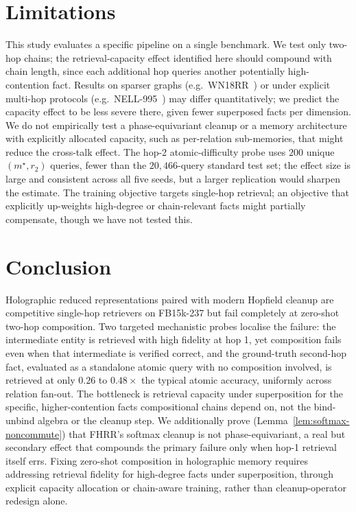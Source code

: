 \documentclass[11pt]{article}
\theoremstyle{definition}
\begin{document}
\section{Limitations}
\label{sec:limitations}

This study evaluates a specific pipeline on a single benchmark. We test only
two-hop chains; the retrieval-capacity effect identified here should compound
with chain length, since each additional hop queries another potentially
high-contention fact. Results on sparser graphs (e.g.\
WN18RR~\cite{dettmers2018wn18rr}) or under explicit multi-hop protocols (e.g.\
NELL-995~\cite{xiong2017deeppath}) may differ quantitatively; we predict the
capacity effect to be less severe there, given fewer superposed facts per
dimension. We do not empirically test a phase-equivariant cleanup or a memory
architecture with explicitly allocated capacity, such as per-relation
sub-memories, that might reduce the cross-talk effect. The hop-2
atomic-difficulty probe uses $200$ unique $(m^\star, r_2)$ queries, fewer than
the $20{,}466$-query standard test set; the effect size is large and consistent
across all five seeds, but a larger replication would sharpen the estimate. The
training objective targets single-hop retrieval; an objective that explicitly
up-weights high-degree or chain-relevant facts might partially compensate,
though we have not tested this.

\section{Conclusion}
\label{sec:conclusion}

Holographic reduced representations paired with modern Hopfield cleanup are
competitive single-hop retrievers on FB15k-237 but fail completely at zero-shot
two-hop composition. Two targeted mechanistic probes localise the failure: the
intermediate entity is retrieved with high fidelity at hop 1, yet composition
fails even when that intermediate is verified correct, and the ground-truth
second-hop fact, evaluated as a standalone atomic query with no composition
involved, is retrieved at only $0.26$ to $0.48\times$ the typical atomic
accuracy, uniformly across relation fan-out. The bottleneck is retrieval
capacity under superposition for the specific, higher-contention facts
compositional chains depend on, not the bind-unbind algebra or the cleanup
step. We additionally prove (Lemma~\ref{lem:softmax-noncommute}) that FHRR's
softmax cleanup is not phase-equivariant, a real but secondary effect that
compounds the primary failure only when hop-1 retrieval itself errs. Fixing
zero-shot composition in holographic memory requires addressing retrieval
fidelity for high-degree facts under superposition, through explicit capacity
allocation or chain-aware training, rather than cleanup-operator redesign alone.
\end{document}

